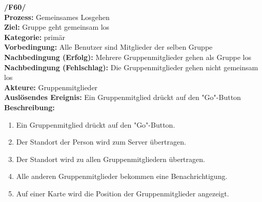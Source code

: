 \documentclass{article}
\begin{document}
\textbf{/F60/} \\
\textbf{Prozess:} Gemeinsames Losgehen \\
\textbf{Ziel:} Gruppe geht gemeinsam los \\
\textbf{Kategorie:} primär \\
\textbf{Vorbedingung:} Alle Benutzer sind Mitglieder der selben Gruppe \\
\textbf{Nachbedingung (Erfolg):} Mehrere Gruppenmitglieder gehen als Gruppe los\\
\textbf{Nachbedingung (Fehlschlag):} Die Gruppenmitglieder gehen nicht gemeinsam los\\
\textbf{Akteure:} Gruppenmitglieder \\
\textbf{Auslösendes Ereignis:} Ein Gruppenmitglied drückt auf den "Go"-Button\\
\textbf{Beschreibung:}
\begin{enumerate}
\setlength{\itemsep}{0pt}
\item Ein Gruppenmitglied drückt auf den "Go"-Button.
\item Der Standort der Person wird zum Server übertragen.
\item Der Standort wird zu allen Gruppenmitgliedern übertragen.
\item Alle anderen Gruppenmitglieder bekommen eine Benachrichtigung.
\item Auf einer Karte wird die Position der Gruppenmitglieder angezeigt.
\end{enumerate}

\end{document}
